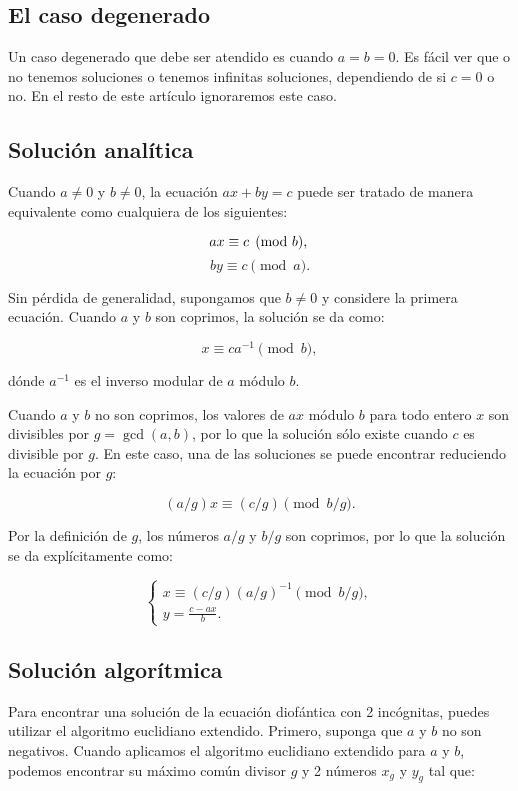 \subsection{El caso degenerado}

Un caso degenerado que debe ser atendido es cuando $a = b = 0$. Es fácil ver que o no tenemos soluciones o tenemos infinitas soluciones, dependiendo de si $c = 0$ o no. En el resto de este artículo ignoraremos este caso.

\subsection{Solución analítica}

Cuando $a \neq 0$ y $b \neq 0$, la ecuación $ax+by=c$ puede ser tratado de manera equivalente como cualquiera de los siguientes:


	$$ax \equiv c \pmod b,\newline$$
	$$by \equiv c \pmod a.$$
	
Sin pérdida de generalidad, supongamos que $b \neq 0$ y considere la primera ecuación. Cuando $a$ y $b$ son coprimos, la solución se da como:

$$x \equiv ca^{-1} \pmod b,$$

dónde $a^{-1}$ es el inverso modular de $a$ módulo $b$.

Cuando $a$ y $b$ no son coprimos, los valores de $ax$ módulo $b$ para todo entero $x$ son divisibles por $g=\gcd(a, b)$, por lo que la solución sólo existe cuando $c$ es divisible por $g$. En este caso, una de las soluciones se puede encontrar reduciendo la ecuación por $g$:

$$(a/g) x \equiv (c/g) \pmod{b/g}.$$

Por la definición de $g$, los números $a/g$ y $b/g$ son coprimos, por lo que la solución se da explícitamente como:

$$\begin{cases}
	x \equiv (c/g)(a/g)^{-1}\pmod{b/g},\\
	y = \frac{c-ax}{b}.
\end{cases}$$

\subsection{Solución algorítmica}

Para encontrar una solución de la ecuación diofántica con 2 incógnitas, puedes utilizar el algoritmo euclidiano extendido. Primero, suponga que $a$ y $b$ no son negativos. Cuando aplicamos el algoritmo euclidiano extendido para $a$ y $b$, podemos encontrar su máximo común divisor $g$ y 2 números $x_g$ y $y_g$ tal que:

